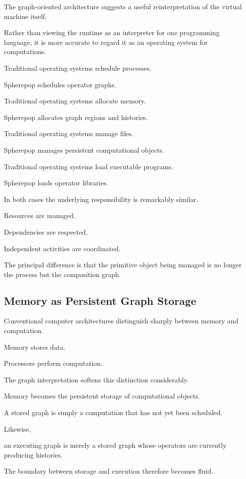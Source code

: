 \documentclass[12pt,oneside]{article}
\begin{document}
The graph-oriented architecture suggests a useful reinterpretation of the virtual machine itself.

Rather than viewing the runtime as an interpreter for one programming language, it is more accurate to regard it as an operating system for computations.

Traditional operating systems schedule processes.

Spherepop schedules operator graphs.

Traditional operating systems allocate memory.

Spherepop allocates graph regions and histories.

Traditional operating systems manage files.

Spherepop manages persistent computational objects.

Traditional operating systems load executable programs.

Spherepop loads operator libraries.

In both cases the underlying responsibility is remarkably similar.

Resources are managed.

Dependencies are respected.

Independent activities are coordinated.

The principal difference is that the primitive object being managed is no longer the process but the composition graph.

\subsection{Memory as Persistent Graph Storage}

Conventional computer architectures distinguish sharply between memory and computation.

Memory stores data.

Processors perform computation.

The graph interpretation softens this distinction considerably.

Memory becomes the persistent storage of computational objects.

A stored graph is simply a computation that has not yet been scheduled.

Likewise,

an executing graph is merely a stored graph whose operators are currently producing histories.

The boundary between storage and execution therefore becomes fluid.
\end{document}
